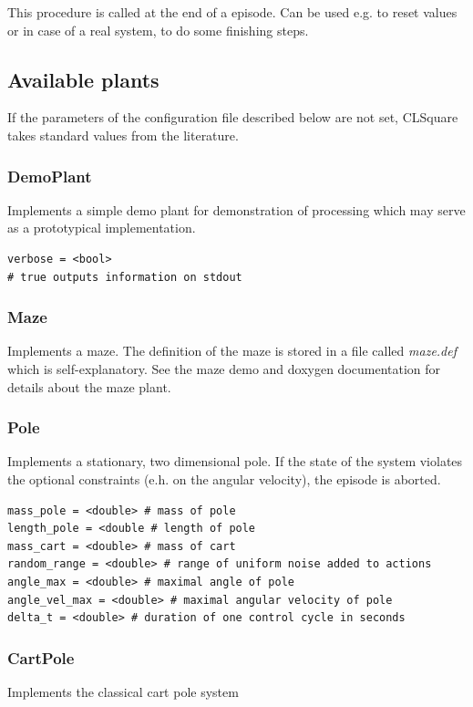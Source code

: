 \documentclass[a4paper,12pt,german]{article}
\begin{document}
This procedure is called at the end of a  episode. Can be used e.g. to reset values
or in case of a real system, to do some finishing steps.


\subsection{Available plants}
If the parameters of the configuration file described below are not
set, CLSquare takes standard values from the literature.

\subsubsection{DemoPlant}
Implements a simple demo plant for demonstration of processing which may serve as a  
prototypical implementation.

\begin{verbatim}
verbose = <bool> 
# true outputs information on stdout
\end{verbatim}

\subsubsection{Maze}
Implements a maze. The definition of the maze is stored in a file called \emph{maze.def} 
which is self-explanatory. See the maze demo and doxygen documentation for details about
the maze plant.

\subsubsection{Pole}
Implements a stationary, two dimensional pole. If the state of the system
violates the optional constraints (e.h. on the angular velocity), the episode
is aborted.

\begin{verbatim}
mass_pole = <double> # mass of pole
length_pole = <double # length of pole
mass_cart = <double> # mass of cart
random_range = <double> # range of uniform noise added to actions
angle_max = <double> # maximal angle of pole 
angle_vel_max = <double> # maximal angular velocity of pole
delta_t = <double> # duration of one control cycle in seconds
\end{verbatim}

\subsubsection{CartPole}
Implements the classical cart pole system
\end{document}
